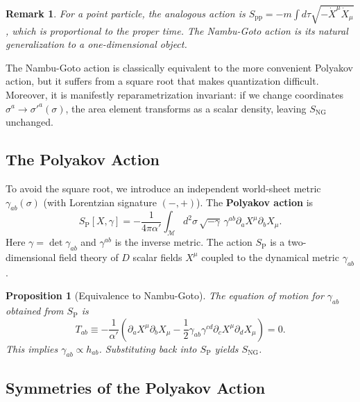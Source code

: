 \documentclass[11pt]{article}
\newtheorem{proposition}{Proposition}
\newtheorem{remark}{Remark}
\begin{document}
\begin{remark}
For a point particle, the analogous action is $S_{\mathrm{pp}} = -m\int d\tau \sqrt{-\dot{X}^\mu \dot{X}_\mu}$, which is proportional to the proper time. The Nambu-Goto action is its natural generalization to a one-dimensional object.
\end{remark}

The Nambu-Goto action is classically equivalent to the more convenient Polyakov action, but it suffers from a square root that makes quantization difficult. Moreover, it is manifestly reparametrization invariant: if we change coordinates $\sigma^a \to \sigma'^a(\sigma)$, the area element transforms as a scalar density, leaving $S_{\mathrm{NG}}$ unchanged.

\subsection{The Polyakov Action}

To avoid the square root, we introduce an independent world-sheet metric $\gamma_{ab}(\sigma)$ (with Lorentzian signature $(-,+)$). The \textbf{Polyakov action} is
\begin{equation}
S_{\mathrm{P}}[X,\gamma] = -\frac{1}{4\pi\alpha'} \int_{\mathcal{M}} d^2\sigma \, \sqrt{-\gamma} \, \gamma^{ab} \partial_a X^\mu \partial_b X_\mu. \label{eq:Polyakov}
\end{equation}
Here $\gamma = \det \gamma_{ab}$ and $\gamma^{ab}$ is the inverse metric. The action $S_{\mathrm{P}}$ is a two-dimensional field theory of $D$ scalar fields $X^\mu$ coupled to the dynamical metric $\gamma_{ab}$.

\begin{proposition}[Equivalence to Nambu-Goto]
The equation of motion for $\gamma_{ab}$ obtained from $S_{\mathrm{P}}$ is
\begin{equation}
T_{ab} \equiv -\frac{1}{\alpha'} \left( \partial_a X^\mu \partial_b X_\mu - \frac{1}{2}\gamma_{ab} \gamma^{cd}\partial_c X^\mu \partial_d X_\mu \right) = 0.
\end{equation}
This implies $\gamma_{ab} \propto h_{ab}$. Substituting back into $S_{\mathrm{P}}$ yields $S_{\mathrm{NG}}$.
\end{proposition}

\subsection{Symmetries of the Polyakov Action}
\end{document}
